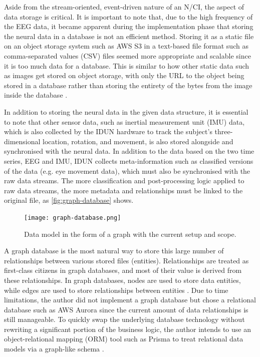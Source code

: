 Aside from the stream-oriented, event-driven nature of an N/CI, the aspect of data storage is critical. It is important to note that, due to the high frequency of the EEG data, it became apparent during the implementation phase that storing the neural data in a database is not an efficient method. Storing it as a static file on an object storage system such as AWS S3 in a text-based file format such as comma-separated values (CSV) files seemed more appropriate and scalable since it is too much data for a database. This is similar to how other static data such as images get stored on object storage, with only the URL to the object being stored in a database rather than storing the entirety of the bytes from the image inside the database \citep{datanamic_store_nodate}.

In addition to storing the neural data in the given data structure, it is essential to note that other sensor data, such as inertial measurement unit (IMU) data, which is also collected by the IDUN hardware to track the subject’s three-dimensional location, rotation, and movement, is also stored alongside and synchronised with the neural data. In addition to the data based on the two time series, EEG and IMU, IDUN collects meta-information such as classified versions of the data (e.g. eye movement data), which must also be synchronised with the raw data streams. The more classification and post-processing logic applied to raw data streams, the more metadata and relationships must be linked to the original file, as \autoref{fig:graph-database} shows.

\begin{figure}[!ht]
  \centering
  \texttt{[image: graph-database.png]}
  \caption{Data model in the form of a graph with the current setup and scope.}
  \label{fig:graph-database}
\end{figure}

A graph database is the most natural way to store this large number of relationships between various stored files (entities). Relationships are treated as first-class citizens in graph databases, and most of their value is derived from these relationships. In graph databases, nodes are used to store data entities, while edges are used to store relationships between entities \citep{amazon_web_services_inc_what_nodate}. Due to time limitations, the author did not implement a graph database but chose a relational database such as AWS Aurora since the current amount of data relationships is still manageable. To quickly swap the underlying database technology without rewriting a significant portion of the business logic, the author intends to use an object-relational mapping (ORM) tool such as Prisma to treat relational data models via a graph-like schema \citep{prisma_data_nodate}.


